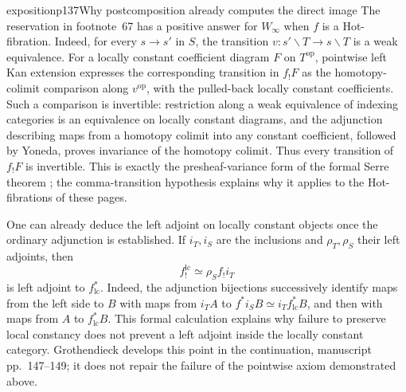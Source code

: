 \begin{dcomment}{exposition}{p137}{Why postcomposition already computes the direct image}
The reservation in footnote~67 has a positive answer for $W_\infty$ when $f$ is a Hot-fibration. Indeed, for every $s\to s'$ in $S$, the transition $v:s'\backslash T\to s\backslash T$ is a weak equivalence. For a locally constant coefficient diagram $F$ on $T^{\mathrm{op}}$, pointwise left Kan extension expresses the corresponding transition in $f_!F$ as the homotopy-colimit comparison along $v^{\mathrm{op}}$, with the pulled-back locally constant coefficients. Such a comparison is invertible: restriction along a weak equivalence of indexing categories is an equivalence on locally constant diagrams, and the adjunction describing maps from a homotopy colimit into any constant coefficient, followed by Yoneda, proves invariance of the homotopy colimit. Thus every transition of $f_!F$ is invertible. This is exactly the presheaf-variance form of the formal Serre theorem \citep[Theorem~1.3 and Propositions~1.10, 1.15]{Cisinski2009LocallyConstant}; the comma-transition hypothesis explains why it applies to the Hot-fibrations of these pages.

One can already deduce the left adjoint on locally constant objects once the ordinary adjunction is established. If $i_T,i_S$ are the inclusions and $\rho_T,\rho_S$ their left adjoints, then
\[
 f_!^{\mathrm{lc}}\simeq\rho_S f_!i_T
\]
is left adjoint to $f^*_{\mathrm{lc}}$. Indeed, the adjunction bijections successively identify maps from the left side to $B$ with maps from $i_TA$ to $f^*i_SB\simeq i_Tf^*_{\mathrm{lc}}B$, and then with maps from $A$ to $f^*_{\mathrm{lc}}B$. This formal calculation explains why failure to preserve local constancy does not prevent a left adjoint inside the locally constant category. Grothendieck develops this point in the continuation, manuscript pp.~147--149; it does not repair the failure of the pointwise axiom demonstrated above.
\end{dcomment}

